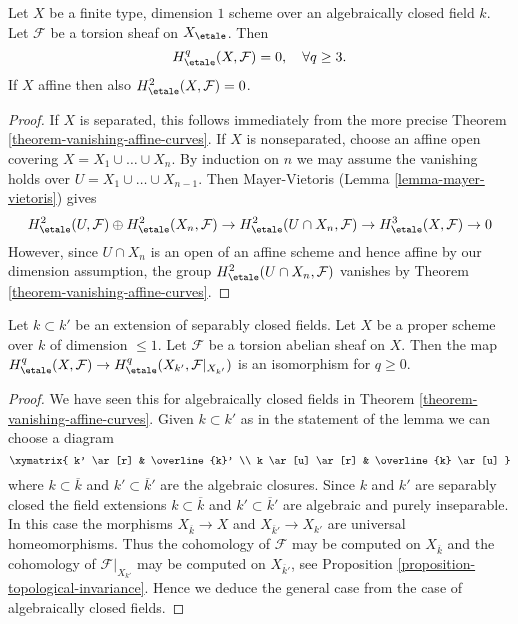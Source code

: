 \begin{theorem}
\label{theorem-vanishing-curves}
Let $X$ be a finite type, dimension $1$ scheme over an
algebraically closed field $k$. Let $\mathcal{F}$ be a torsion sheaf
on $X_\etale$. Then
$$
H_\etale^q(X, \mathcal{F}) = 0, \quad \forall q \geq 3.
$$
If $X$ affine then also $H_\etale^2(X, \mathcal{F}) = 0$.
\end{theorem}

\begin{proof}
If $X$ is separated, this follows immediately from the more precise
Theorem \ref{theorem-vanishing-affine-curves}.
If $X$ is nonseparated, choose an affine open covering
$X = X_1 \cup \ldots \cup X_n$. By induction on $n$ we may assume
the vanishing holds over $U = X_1 \cup \ldots \cup X_{n - 1}$.
Then Mayer-Vietoris (Lemma \ref{lemma-mayer-vietoris}) gives
$$
H^2_\etale(U, \mathcal{F}) \oplus H^2_\etale(X_n, \mathcal{F}) \to
H^2_\etale(U \cap X_n, \mathcal{F}) \to
H^3_\etale(X, \mathcal{F}) \to 0
$$
However, since $U \cap X_n$ is an open of an affine scheme
and hence affine by our dimension assumption, the group
$H^2_\etale(U \cap X_n, \mathcal{F})$ vanishes
by Theorem \ref{theorem-vanishing-affine-curves}.
\end{proof}

\begin{lemma}
\label{lemma-base-change-dim-1-separably-closed}
Let $k \subset k'$ be an extension of separably closed fields.
Let $X$ be a proper scheme over $k$ of dimension $\leq 1$.
Let $\mathcal{F}$ be a torsion abelian sheaf on $X$.
Then the map $H^q_\etale(X, \mathcal{F}) \to
H^q_\etale(X_{k'}, \mathcal{F}|_{X_{k'}})$ is an isomorphism
for $q \geq 0$.
\end{lemma}

\begin{proof}
We have seen this for algebraically closed fields in
Theorem \ref{theorem-vanishing-affine-curves}.
Given $k \subset k'$ as in the statement of the lemma we can
choose a diagram
$$
\xymatrix{
k' \ar[r] & \overline{k}' \\
k \ar[u] \ar[r] & \overline{k} \ar[u]
}
$$
where $k \subset \overline{k}$ and $k' \subset \overline{k}'$ are
the algebraic closures. Since $k$ and $k'$ are separably closed
the field extensions
$k \subset \overline{k}$ and $k' \subset \overline{k}'$
are algebraic and purely inseparable. In this case the morphisms
$X_{\overline{k}} \to X$ and $X_{\overline{k}'} \to X_{k'}$
are universal homeomorphisms. Thus the cohomology of $\mathcal{F}$
may be computed on $X_{\overline{k}}$ and the cohomology
of $\mathcal{F}|_{X_{k'}}$ may be computed on $X_{\overline{k}'}$,
see Proposition \ref{proposition-topological-invariance}.
Hence we deduce the general case from the case of algebraically
closed fields.
\end{proof}




